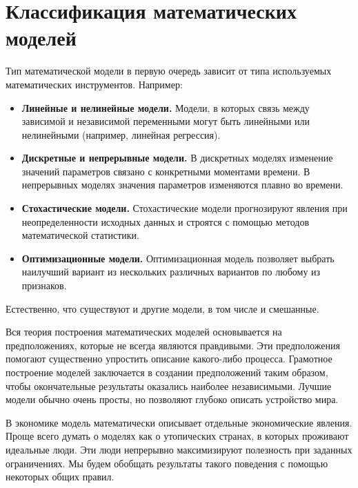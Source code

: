 \section{Классификация математических моделей}

Тип математической модели в первую очередь зависит от типа используемых математических инструментов.
Например:
\begin{itemize}
	\item \textbf{Линейные и нелинейные модели.}
	Модели, в которых связь между зависимой и независимой переменными могут быть линейными или нелинейными (например, линейная регрессия).
	\item \textbf{Дискретные и непрерывные модели.}
	В дискретных моделях изменение значений параметров связано с конкретными моментами времени.
	В непрерывных моделях значения параметров изменяются плавно во времени.
	\item \textbf{Стохастические модели.}
	Стохастические модели прогнозируют явления при неопределенности исходных данных и строятся с помощью методов математической статистики.
	\item \textbf{Оптимизационные модели.}
	Оптимизационная модель позволяет выбрать наилучший вариант из нескольких различных вариантов по любому из признаков.
\end{itemize}
Естественно, что существуют и другие модели, в том числе и смешанные.

Вся теория построения математических моделей основывается на предположениях, которые не всегда являются правдивыми.
Эти предположения помогают существенно упростить описание какого-либо процесса.
Грамотное построение моделей заключается в создании предположений таким образом, чтобы окончательные результаты оказались наиболее независимыми.
Лучшие модели обычно очень просты, но позволяют глубоко описать устройство мира.

В экономике модель математически описывает отдельные экономические явления.
Проще всего думать о моделях как о утопических странах, в которых проживают идеальные люди.
Эти люди непрерывно максимизируют полезность при заданных ограничениях.
Мы будем обобщать результаты такого поведения с помощью некоторых общих правил.
